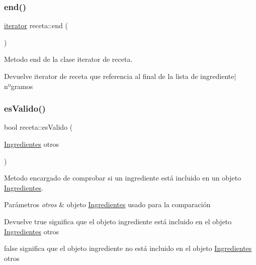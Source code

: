 \subsubsection{\texorpdfstring{end()}{end()}}
{\footnotesize\ttfamily \hyperlink{classreceta_1_1iterator}{iterator} receta\+::end (\begin{DoxyParamCaption}{ }\end{DoxyParamCaption})\hspace{0.3cm}{\ttfamily [inline]}}



Metodo end de la clase iterator de receta. 

\begin{DoxyReturn}{Devuelve}
iterator de receta que referencia al final de la lista de ingrediente$\vert$nºgramos 
\end{DoxyReturn}
\mbox{\label{classreceta_a51a61b188a74ad6e912e07d4d32e3fd4}} 
\subsubsection{\texorpdfstring{es\+Valido()}{esValido()}}
{\footnotesize\ttfamily bool receta\+::es\+Valido (\begin{DoxyParamCaption}\item[{\hyperlink{classIngredientes}{Ingredientes}}]{otros }\end{DoxyParamCaption})}



Metodo encargado de comprobar si un ingrediente está incluido en un objeto \hyperlink{classIngredientes}{Ingredientes}. 


\begin{DoxyParams}{Parámetros}
{\em otros} & objeto \hyperlink{classIngredientes}{Ingredientes} usado para la comparación \\
\hline
\end{DoxyParams}
\begin{DoxyReturn}{Devuelve}
true significa que el objeto ingrediente está incluido en el objeto \hyperlink{classIngredientes}{Ingredientes} otros 

false significa que el objeto ingrediente no está incluido en el objeto \hyperlink{classIngredientes}{Ingredientes} otros 
\end{DoxyReturn}
\mbox{\label{classreceta_a5ee3ea9921c07bdff53fd09aa03d641d}} 
